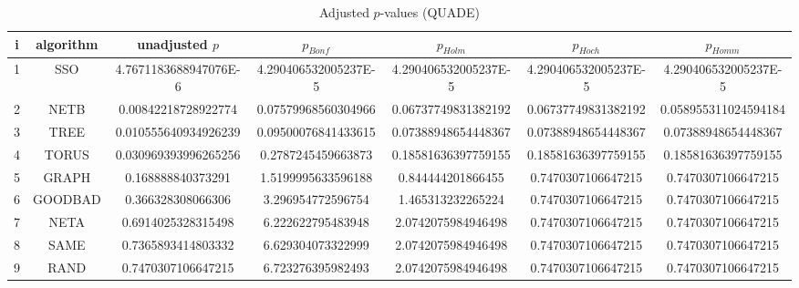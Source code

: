 \documentclass[a4paper,10pt]{article}
\begin{document}
\begin{landscape}
\begin{table}[!htp]
\centering\scriptsize
\caption{Adjusted $p$-values (QUADE)}
\begin{tabular}{ccccccc}
i&algorithm&unadjusted $p$&$p_{Bonf}$&$p_{Holm}$&$p_{Hoch}$&$p_{Homm}$\\
\hline
1& SSO&4.7671183688947076E-6&4.290406532005237E-5&4.290406532005237E-5&4.290406532005237E-5&4.290406532005237E-5\\
2& NETB&0.00842218728922774&0.07579968560304966&0.06737749831382192&0.06737749831382192&0.058955311024594184\\
3& TREE&0.010555640934926239&0.09500076841433615&0.07388948654448367&0.07388948654448367&0.07388948654448367\\
4& TORUS&0.030969393996265256&0.2787245459663873&0.18581636397759155&0.18581636397759155&0.18581636397759155\\
5& GRAPH&0.168888840373291&1.5199995633596188&0.844444201866455&0.7470307106647215&0.7470307106647215\\
6& GOODBAD&0.366328308066306&3.296954772596754&1.465313232265224&0.7470307106647215&0.7470307106647215\\
7& NETA&0.6914025328315498&6.222622795483948&2.0742075984946498&0.7470307106647215&0.7470307106647215\\
8& SAME&0.7365893414803332&6.629304073322999&2.0742075984946498&0.7470307106647215&0.7470307106647215\\
9& RAND&0.7470307106647215&6.723276395982493&2.0742075984946498&0.7470307106647215&0.7470307106647215\\
\hline
\end{tabular}
\end{table}


\end{landscape}
\end{document}
